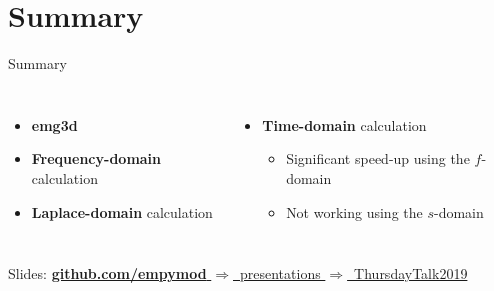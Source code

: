 \documentclass[xcolor=svgnames, aspectratio=169]{beamer}
\newcommand{\dra}{\ensuremath{\Rightarrow }~}
\begin{document}
  \section{Summary} %

  \begin{frame}%
    {Summary}
    \centering
    \begin{columns}
        \begin{itemize}\itemsep.3cm
          \item \textbf{emg3d}
          \item \textbf{Frequency-domain} calculation
          \item \textbf{Laplace-domain} calculation
        \end{itemize}
        \begin{itemize}\itemsep.3cm
          \item \textbf{Time-domain} calculation
            \begin{itemize}
              \item Significant speed-up using the $f$-domain
              \item Not working using the $s$-domain
            \end{itemize}
        \end{itemize}
    \end{columns}
    \vfill
    \alert{Slides:}
    \href{https://github.com/empymod/presentations/tree/master/ThursdayTalk2019}%
    {\textbf{github.com/empymod} \dra presentations \dra ThursdayTalk2019}
  \end{frame}
\end{document}

